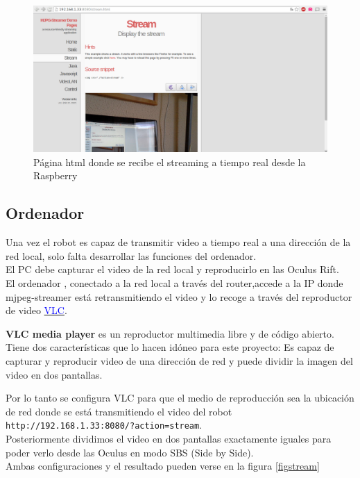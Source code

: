 \documentclass[twoside, 11pt]{epstfg}
\begin{document}
\begin{figure}[H]
	\centerline{
		\mbox{\includegraphics[width=.80\textwidth]{images/pagStream.png}}
	}
	\caption{Página html donde se recibe el streaming a tiempo real desde la Raspberry }
\end{figure}\label{fig::stream}


\subsection{Ordenador}
Una vez el robot es capaz de transmitir video a tiempo real a una dirección de la red local, solo falta desarrollar las funciones del ordenador.\\
El PC debe capturar el video de la red local y reproducirlo en las Oculus Rift.\\
El ordenador , conectado a la red local a través del router,accede a la IP donde mjpeg-streamer está retransmitiendo el video y lo recoge a través del reproductor de video  \href{http://www.videolan.org/vlc/}{\textcolor{blue}{VLC}}.

\textbf{VLC media player} es un reproductor multimedia libre y de código abierto. Tiene dos características que lo hacen idóneo para este proyecto: Es capaz de capturar y reproducir video de una dirección de red y puede dividir la imagen del video en dos pantallas.

Por lo tanto se configura VLC para que el medio de reproducción sea la ubicación de red donde se está transmitiendo el video del robot \texttt{http://192.168.1.33:8080/?action=stream}.\\
Posteriormente dividimos el video en dos pantallas exactamente iguales para poder verlo desde las Oculus en modo SBS (Side by Side).\\Ambas configuraciones y el resultado pueden verse en la figura \ref{figstream}
\end{document}
